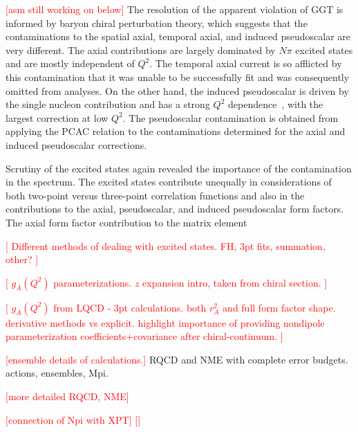 \textcolor{red}{[asm still working on below]}
The resolution of the apparent violation of GGT
 is informed by baryon chiral perturbation theory, which suggests that the contaminations
 to the spatial axial, temporal axial, and induced pseudoscalar are very different.
The axial contributions are largely dominated by $N\pi$ excited states
 and are mostly independent of $Q^2$.
The temporal axial current is so afflicted by this contamination that it
 was unable to be successfully fit and was consequently omitted from analyses.
On the other hand, the induced pseudoscalar is driven by the single nucleon contribution and has
 a strong $Q^2$ dependence~\cite{Bar:2018xyi}, with the largest correction at low $Q^2$.
The pseudoscalar contamination is obtained from applying the PCAC relation
 to the contaminations determined for the axial and induced pseudoscalar corrections.

Scrutiny of the excited states again revealed the importance of the contamination in the spectrum.
The excited states contribute unequally in considerations of both
 two-point versus three-point correlation functions and also in
 the contributions to the axial, pseudoscalar, and induced pseudoscalar form factors.
The axial form factor contribution to the matrix element


\textcolor{red}{[
 Different methods of dealing with excited states.
 FH, 3pt fits, summation, other?
]}

\textcolor{red}{[
 $g_A(Q^2)$ parameterizations.
 $z$ expansion intro, taken from chiral section.
]}

\textcolor{red}{[
$g_A(Q^2)$ from LQCD - 3pt calculations.
both $r_A^2$ and full form factor shape.
derivative methods vs explicit.
highlight importance of providing nondipole parameterization
 coefficients+covariance after chiral-continuum.
]}

\textcolor{red}{[ensemble details of calculations.]}
RQCD and NME with complete error budgets.
actions, ensembles, Mpi.

\textcolor{red}{[more detailed RQCD, NME]}

\textcolor{red}{[connection of Npi with XPT]}
\textcolor{red}{[]}

